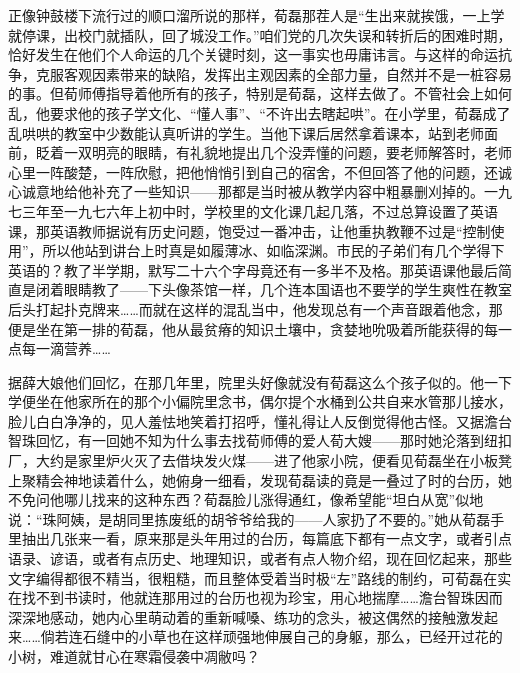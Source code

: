 \par 正像钟鼓楼下流行过的顺口溜所说的那样，荀磊那茬人是“生出来就挨饿，一上学就停课，出校门就插队，回了城没工作。”咱们党的几次失误和转折后的困难时期，恰好发生在他们个人命运的几个关键时刻，这一事实也毋庸讳言。与这样的命运抗争，克服客观因素带来的缺陷，发挥出主观因素的全部力量，自然并不是一桩容易的事。但荀师傅指导着他所有的孩子，特别是荀磊，这样去做了。不管社会上如何乱，他要求他的孩子学文化、“懂人事”、“不许出去瞎起哄”。在小学里，荀磊成了乱哄哄的教室中少数能认真听讲的学生。当他下课后居然拿着课本，站到老师面前，眨着一双明亮的眼睛，有礼貌地提出几个没弄懂的问题，要老师解答时，老师心里一阵酸楚，一阵欣慰，把他悄悄引到自己的宿舍，不但回答了他的问题，还诚心诚意地给他补充了一些知识——那都是当时被从教学内容中粗暴删刈掉的。一九七三年至一九七六年上初中时，学校里的文化课几起几落，不过总算设置了英语课，那英语教师据说有历史问题，饱受过一番冲击，让他重执教鞭不过是“控制使用”，所以他站到讲台上时真是如履薄冰、如临深渊。市民的子弟们有几个学得下英语的？教了半学期，默写二十六个字母竟还有一多半不及格。那英语课他最后简直是闭着眼睛教了——下头像茶馆一样，几个连本国语也不要学的学生爽性在教室后头打起扑克牌来……而就在这样的混乱当中，他发现总有一个声音跟着他念，那便是坐在第一排的荀磊，他从最贫瘠的知识土壤中，贪婪地吮吸着所能获得的每一点每一滴营养……
\par 据薛大娘他们回忆，在那几年里，院里头好像就没有荀磊这么个孩子似的。他一下学便坐在他家所在的那个小偏院里念书，偶尔提个水桶到公共自来水管那儿接水，脸儿白白净净的，见人羞怯地笑着打招呼，懂礼得让人反倒觉得他古怪。又据澹台智珠回忆，有一回她不知为什么事去找荀师傅的爱人荀大嫂——那时她沦落到纽扣厂，大约是家里炉火灭了去借块发火煤——进了他家小院，便看见荀磊坐在小板凳上聚精会神地读着什么，她俯身一细看，发现荀磊读的竟是一叠过了时的台历，她不免问他哪儿找来的这种东西？荀磊脸儿涨得通红，像希望能“坦白从宽”似地说：“珠阿姨，是胡同里拣废纸的胡爷爷给我的——人家扔了不要的。”她从荀磊手里抽出几张来一看，原来那是头年用过的台历，每篇底下都有一点文字，或者引点语录、谚语，或者有点历史、地理知识，或者有点人物介绍，现在回忆起来，那些文字编得都很不精当，很粗糙，而且整体受着当时极“左”路线的制约，可荀磊在实在找不到书读时，他就连那用过的台历也视为珍宝，用心地揣摩……澹台智珠因而深深地感动，她内心里萌动着的重新喊嗓、练功的念头，被这偶然的接触激发起来……倘若连石缝中的小草也在这样顽强地伸展自己的身躯，那么，已经开过花的小树，难道就甘心在寒霜侵袭中凋敝吗？
